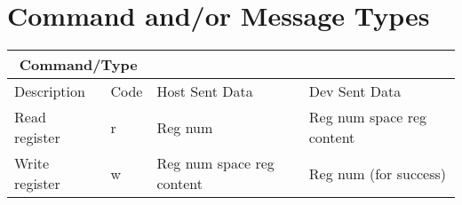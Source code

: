 \documentclass{customdocclass}
\begin{document}
\section{Command and/or Message Types}

\begin{center}
\small
\begin{tabularx}{\textwidth}{|X|l|X|X|} \hline
\multicolumn{2}{|c|}{Command/Type} & & \\ \hline
Description & Code & Host Sent Data & Dev Sent Data \\ \hline
Read register & r & Reg num & Reg num space reg content \\ \hline
Write register & w & Reg num space reg content & Reg num (for success) \\ \hline
\end{tabularx}
\end{center}
\end{document}
